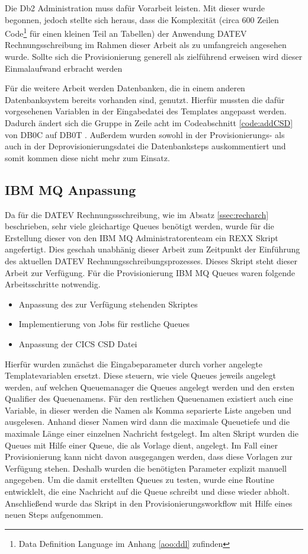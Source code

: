 Die Db2 Administration muss dafür Vorarbeit leisten.
Mit dieser wurde begonnen, jedoch stellte sich heraus, dass die Komplexität (circa 600 Zeilen Code\footnote{Data Definition Language im Anhang \ref{aoo:ddl} zufinden} für einen kleinen Teil an Tabellen) der Anwendung DATEV Rechnungsschreibung im Rahmen dieser Arbeit als zu umfangreich angesehen wurde.
Sollte sich die Provisionierung generell als zielführend erweisen wird dieser Einmalaufwand erbracht werden

Für die weitere Arbeit werden Datenbanken, die in einem anderen Datenbanksystem bereits vorhanden sind, genutzt.
Hierfür mussten die dafür vorgesehenen Variablen in der Eingabedatei des Templates angepasst werden.
Dadurch ändert sich die Gruppe in Zeile acht im Codeabschnitt \ref{code:addCSD} von \glqq DB0C \grqq{} auf \glqq DB0T \grqq.
Außerdem wurden sowohl in der Provisionierungs- als auch in der Deprovisionierungsdatei die Datenbanksteps auskommentiert und somit kommen diese nicht mehr zum Einsatz.

\subsection{IBM MQ Anpassung}\label{ssec:mqentw}
Da für die DATEV Rechnungssschreibung, wie im Absatz \ref{ssec:recharch} beschrieben, sehr viele gleichartige Queues benötigt werden, wurde für die Erstellung dieser von den IBM MQ Administratorenteam ein REXX Skript angefertigt.
Dies geschah unabhänig dieser Arbeit zum Zeitpunkt der Einführung des aktuellen DATEV Rechnungsschreibungsprozesses.
Dieses Skript steht dieser Arbeit zur Verfügung.
Für die Provisionierung IBM MQ Queues waren folgende Arbeitsschritte notwendig.

\begin{samepage}
\begin{itemize}
\item Anpassung des zur Verfügung stehenden Skriptes
\item Implementierung von Jobs für restliche Queues
\item Anpassung der CICS CSD Datei
\end{itemize}
\end{samepage}

Hierfür wurden zunächst die Eingabeparameter durch vorher angelegte Templatevariablen ersetzt.
Diese steuern, wie viele Queues jeweils angelegt werden, auf welchen Queuemanager die Queues angelegt werden und den ersten Qualifier des Queuenamens.
Für den restlichen Queuenamen existiert auch eine Variable, in dieser werden die Namen als Komma separierte Liste angeben und ausgelesen.
Anhand dieser Namen wird dann die maximale Queuetiefe und die maximale Länge einer einzelnen Nachricht festgelegt.
Im alten Skript wurden die Queues mit Hilfe einer Queue, die als Vorlage dient, angelegt.
Im Fall einer Provisionierung kann nicht davon ausgegangen werden, dass diese Vorlagen zur Verfügung stehen.
Deshalb wurden die benötigten Parameter explizit manuell angegeben.
Um die damit erstellten Queues zu testen, wurde eine Routine entwicklelt, die eine Nachricht auf die Queue schreibt und diese wieder abholt.
Anschließend wurde das Skript in den Provisionierungsworkflow mit Hilfe eines neuen Steps aufgenommen.

